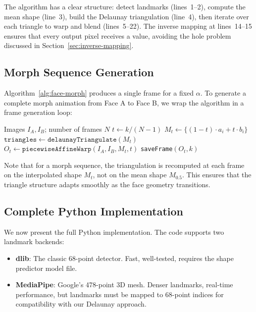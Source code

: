 The algorithm has a clear structure: detect landmarks (lines~1--2), compute the mean shape (line~3), build the Delaunay triangulation (line~4), then iterate over each triangle to warp and blend (lines~5--22). The inverse mapping at lines~14--15 ensures that every output pixel receives a value, avoiding the hole problem discussed in Section~\ref{sec:inverse-mapping}.

\subsection{Morph Sequence Generation}

Algorithm~\ref{alg:face-morph} produces a single frame for a fixed $\alpha$. To generate a complete morph animation from Face A to Face B, we wrap the algorithm in a frame generation loop:

\begin{algorithm}[t]
\caption{Generate Morph Sequence}
\label{alg:morph-sequence}
\begin{algorithmic}[1]
\Require Images $I_A, I_B$; number of frames $N$
    \State $t \gets k / (N - 1)$ 
    \State $M_t \gets \{(1-t) \cdot a_i + t \cdot b_i\}$ 
    \State $\texttt{triangles} \gets \texttt{delaunayTriangulate}(M_t)$
    \State $O_t \gets \texttt{piecewiseAffineWarp}(I_A, I_B, M_t, t)$
    \State \texttt{saveFrame}$(O_t, k)$
\EndFor
\end{algorithmic}
\end{algorithm}

Note that for a morph sequence, the triangulation is recomputed at each frame on the interpolated shape $M_t$, not on the mean shape $M_{0.5}$. This ensures that the triangle structure adapts smoothly as the face geometry transitions.

\subsection{Complete Python Implementation}

We now present the full Python implementation. The code supports two landmark backends:

\begin{itemize}
    \item \textbf{dlib}: The classic 68-point detector. Fast, well-tested, requires the shape predictor model file.
    \item \textbf{MediaPipe}: Google's 478-point 3D mesh. Denser landmarks, real-time performance, but landmarks must be mapped to 68-point indices for compatibility with our Delaunay approach.
\end{itemize}

